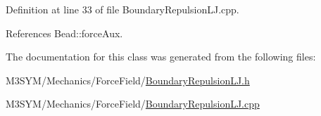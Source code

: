 Definition at line 33 of file Boundary\+Repulsion\+L\+J.\+cpp.



References Bead\+::force\+Aux.



The documentation for this class was generated from the following files\+:\begin{DoxyCompactItemize}
\item 
M3\+S\+Y\+M/\+Mechanics/\+Force\+Field/\hyperlink{BoundaryRepulsionLJ_8h}{Boundary\+Repulsion\+L\+J.\+h}\item 
M3\+S\+Y\+M/\+Mechanics/\+Force\+Field/\hyperlink{BoundaryRepulsionLJ_8cpp}{Boundary\+Repulsion\+L\+J.\+cpp}\end{DoxyCompactItemize}
